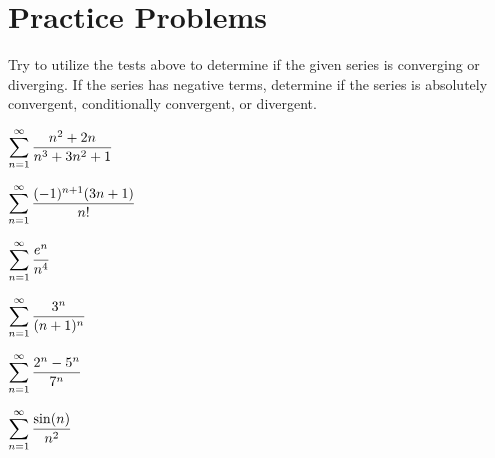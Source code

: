 \documentclass{ximera}
\newcommand{\dsum}{\displaystyle \sum}
\newcommand{\dsumone}{\dsum_{n=1}^{\infty}}
\begin{document}
\newpage

\section*{Practice Problems} Try to utilize the tests above to determine if the given series is converging or diverging. If the series has negative terms, determine if the series is absolutely convergent, conditionally convergent, or divergent.

\begin{problem}
$\dsumone \df{n^2 + 2n}{n^3 + 3n^2 + 1}$
\begin{multipleChoice}
\end{multipleChoice}
\end{problem}
\begin{problem} $\dsumone \df{(-1)^{n+1}(3n+1)}{n!}$
\begin{multipleChoice}
\end{multipleChoice}
\end{problem}
\begin{problem} $\dsumone \df{e^n}{n^4}$
\begin{multipleChoice}
\end{multipleChoice}
\end{problem}
\begin{problem} $\dsumone \df{3^n}{(n+1)^n}$
\begin{multipleChoice}
\end{multipleChoice}
\end{problem}
\begin{problem}$\dsumone \df{2^n - 5^n}{7^n}$
\begin{multipleChoice}
\end{multipleChoice}
\end{problem}
\begin{problem} $\dsumone \df{\sin(n)}{n^2}$
\begin{multipleChoice}
\end{multipleChoice}
\end{problem}
\end{document}
